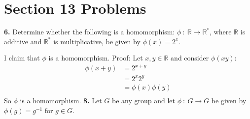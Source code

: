 \documentclass{article}
\begin{document}
\section*{Section 13 Problems}

\textbf{6.} Determine whether the following is a homomorphism: $\phi \: : \: \mathbb{R} \to \mathbb{R}^*$, where $\mathbb{R}$ is additive and $\mathbb{R}^*$ is multiplicative, be given by $\phi(x) = 2^x$.
\newline

I claim that $\phi$ is a homomorphism. 
\newline
Proof: Let $x,y \in \mathbb{R}$ and consider $\phi(xy)$:
\begin{align*}
    \phi(x+y) &= 2^{x+y} \\
    &= 2^x2^y \\
    &= \phi(x)\phi(y) \\
\end{align*}
So $\phi$ is a homomorphism.
\newline\newline\newline
\textbf{8.} Let $G$ be any group and let $\phi \: : \: G \to G$ be given by $\phi(g) = g^{-1}$ for $g \in G$.
\newline
\end{document}

